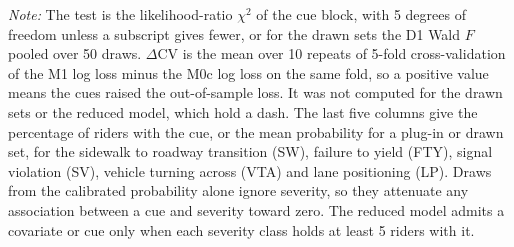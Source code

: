 \begin{table}[pos=htbp]
\begin{threeparttable}
\begin{tabularx}{\textwidth}{>{\raggedright\arraybackslash}X c r r rrrrr}
\bottomrule
\end{tabularx}
\begin{tablenotes}[flushleft]\footnotesize
\item \textit{Note:} The test is the likelihood-ratio $\chi^2$ of the cue block, with 5 degrees of freedom unless a subscript gives fewer, or for the drawn sets the D1 Wald $F$ pooled over 50 draws. $\Delta$CV is the mean over 10 repeats of 5-fold cross-validation of the M1 log loss minus the M0c log loss on the same fold, so a positive value means the cues raised the out-of-sample loss. It was not computed for the drawn sets or the reduced model, which hold a dash. The last five columns give the percentage of riders with the cue, or the mean probability for a plug-in or drawn set, for the sidewalk to roadway transition (SW), failure to yield (FTY), signal violation (SV), vehicle turning across (VTA) and lane positioning (LP). Draws from the calibrated probability alone ignore severity, so they attenuate any association between a cue and severity toward zero. The reduced model admits a covariate or cue only when each severity class holds at least 5 riders with it.
\end{tablenotes}
\end{threeparttable}
\end{table}
